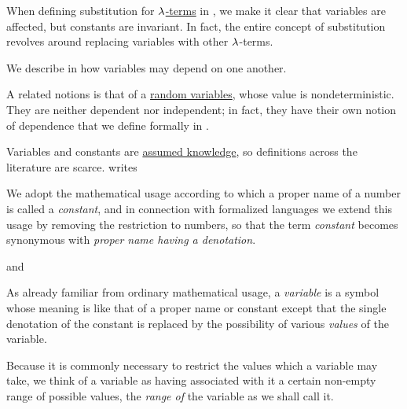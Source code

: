 \begin{comments}
  \item When defining substitution for \hyperref[def:lambda_term]{\( {\mathrm \lambda} \)-terms} in , we make it clear that variables are affected, but constants are invariant. In fact, the entire concept of substitution revolves around replacing variables with other \( {\mathrm \lambda} \)-terms.

  \item We describe in  how variables may depend on one another.

  \item A related notions is that of a \hyperref[def:random_variable]{random variables}, whose value is nondeterministic. They are neither dependent nor independent; in fact, they have their own notion of dependence that we define formally in .

  \item Variables and constants are \hyperref[con:assumed_knowledge]{assumed knowledge}, so definitions across the literature are scarce.  writes
  \begin{displayquote}
    We adopt the mathematical usage according to which a proper name of a number is called a \textit{constant}, and in connection with formalized languages we extend this usage by removing the restriction to numbers, so that the term \textit{constant} becomes synonymous with \textit{proper name having a denotation}.
  \end{displayquote}
  and
  \begin{displayquote}
    As already familiar from ordinary mathematical usage, a \textit{variable} is a symbol whose meaning is like that of a proper name or constant except that the single denotation of the constant is replaced by the possibility of various \textit{values} of the variable.

    Because it is commonly necessary to restrict the values which a variable may take, we think of a variable as having associated with it a certain non-empty range of possible values, the \textit{range of} the variable as we shall call it.
  \end{displayquote}
\end{comments}

